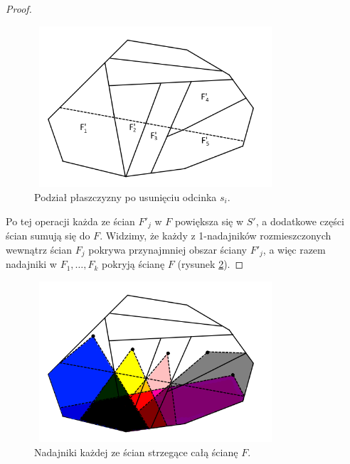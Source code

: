 \documentclass[brudnopis]{xmgr}
\theoremstyle{definition}
\begin{document}
\begin{proof}
\begin{figure}[ht!]
  \centering
  \includegraphics[width=9cm,height=6cm]{rysunki/usuniete_si.png}
  \caption{Podział płaszczyzny po usunięciu odcinka $s_i$.}
  \label{fig:podzial po usunieciu si}
\end{figure} 

Po tej operacji każda ze ścian $F'_j$ w $F$ powiększa się w $S'$, a dodatkowe części ścian sumują się do $F$. Widzimy, że każdy z 1-nadajników rozmieszczonych wewnątrz ścian $F_j$ pokrywa przynajmniej obszar ściany $F'_j$, a więc razem nadajniki w $F_1,\ldots,F_k$ pokryją ścianę $F$ (rysunek \ref{fig:pokrycie f}).
\end{proof}

\begin{figure}[ht!]
  \centering
  \includegraphics[width=9cm,height=6cm]{rysunki/pokrycie_f.png}
  \caption{Nadajniki każdej ze ścian strzegące całą ścianę $F$.}
  \label{fig:pokrycie f}
\end{figure} 
\end{document}

